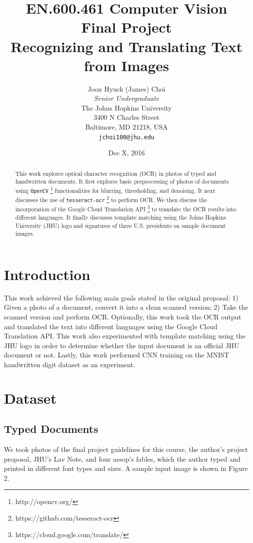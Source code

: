 \documentclass[11pt,letterpaper]{article}
\title{EN.600.461 Computer Vision\\Final Project\\Recognizing and Translating Text from Images}
\author{Joon Hyuck (James) Choi\\
  \textit{Senior Undergraduate}\\
  The Johns Hopkins University\\
  3400 N Charles Street\\
  Baltimore, MD 21218, USA\\
  {\tt jchoi100@jhu.edu}}
\date{Dec X, 2016}
\begin{document}
\maketitle
\begin{abstract}
  This work explores optical character recognition (OCR) in photos of typed and handwritten documents. It first explores basic preprocessing of photos of documents using {\tt OpenCV} \footnote{http://opencv.org/} functionalities for blurring, thresholding, and denoising. It next discusses the use of {\tt tesseract-ocr} \footnote{https://github.com/tesseract-ocr} to perform OCR. We then discuss the incorporation of the Google Cloud Translation API \footnote{https://cloud.google.com/translate/} to translate the OCR results into different languages. It finally discusses template matching using the Johns Hopkins University (JHU) logo and signatures of three U.S. presidents on sample document images. 
\end{abstract}

\section{Introduction}

This work achieved the following main goals stated in the original proposal: 1) Given a photo of a document, convert it into a clean scanned version; 2) Take the scanned version and perform OCR. Optionally, this work took the OCR output and translated the text into different languages using the Google Cloud Translation API. This work also experimented with template matching using the JHU logo in order to determine whether the input document is an official JHU document or not. Lastly, this work performed CNN training on the MNIST handwritten digit dataset as an experiment.

\section{Dataset}

\subsection{Typed Documents}

We took photos of the final project guidelines for this course, the author's project proposal, JHU's Lav Note, and four aesop's fables, which the author typed and printed in different font types and sizes. A sample input image is shown in Figure 2.
\end{document}
